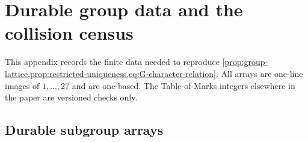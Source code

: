 \section{Durable group data and the collision census}
\label{app:group-census}

This appendix records the finite data needed to reproduce
\cref{prop:group-lattice,prop:restricted-uniqueness,eq:G-character-relation}.
All arrays are one-line images of $1,\ldots,27$ and are one-based.  The
Table-of-Marks integers elsewhere in the paper are versioned checks only.

\subsection{Durable subgroup arrays}
\label{app:durable-arrays}


